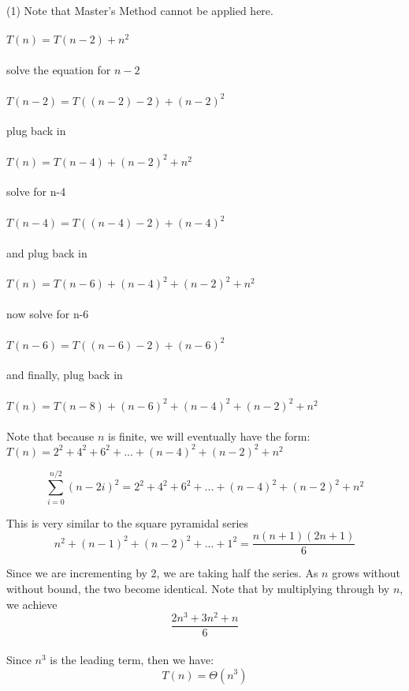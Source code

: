 \documentclass[20pt]{article} %
\begin{document}
(1) Note that Master's Method cannot be applied here.
\\ \\
$T(n) = T(n-2) + n^{2}$
\\ \\ solve the equation for $n-2$\\ \\
$T(n-2) = T((n-2) - 2) + (n-2)^{2}$
\\ \\ plug back in \\ \\ 
$T(n) = T(n-4) + (n-2)^{2} + n^{2}$
\\ \\ solve for n-4 \\ \\ 
$T(n-4) = T((n-4) - 2) + (n-4)^{2}$ 
\\ \\ and plug back in \\ \\ 
$T(n) = T(n-6) + (n-4)^{2} + (n-2)^{2} + n^{2}$
\\ \\ now solve for n-6 \\ \\
$T(n-6) = T((n-6) - 2) + (n-6)^{2}$
\\ \\ and finally, plug back in \\ \\
$T(n) = T(n-8) + (n-6)^{2} + (n-4)^{2} + (n-2)^{2} + n^{2}$
\\ \\ 
Note that because $n$ is finite, we will eventually have the form: \\ 
$T(n) = 2^{2} + 4^{2} + 6^{2} + ... + (n-4)^{2} + (n-2)^{2} + n^{2}$

$$\sum_{i=0}^{n/2} (n-2i)^2 = 2^{2} + 4^{2} + 6^{2} + ... + (n-4)^{2} + (n-2)^{2} + n^{2}$$

This is very similar to the square pyramidal series \\

$$ n^{2} + (n-1)^{2} + (n-2)^{2} + ... + 1^{2} = \frac{n(n+1)(2n+1)}{6}$$

Since we are incrementing by 2, we are taking half the series.  As $n$ grows without without bound, the two become identical.
Note that by multiplying through by $n$, we achieve\\
$$\frac{2n^{3} + 3n^{2} +n}{6}$$ \\

Since $n^3$ is the leading term, then we have:
$$T(n) = \Theta(n^{3})$$
\end{document}
